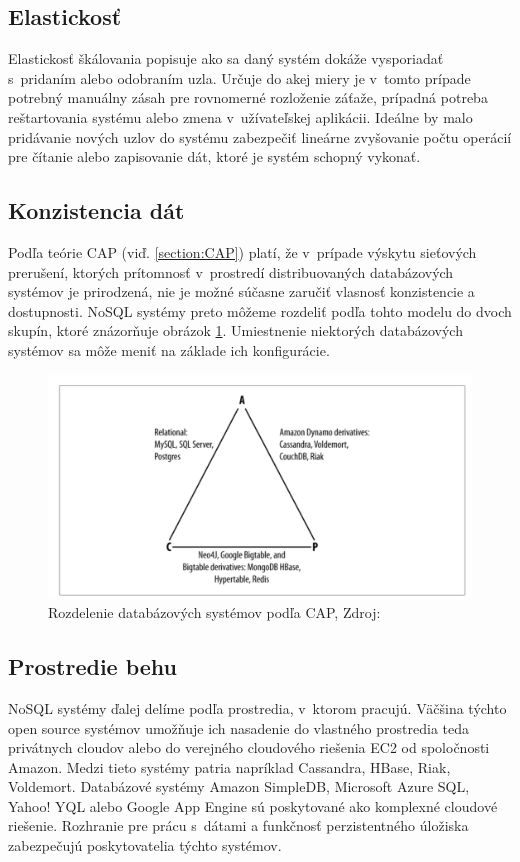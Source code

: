 \documentclass[11pt,twoside,a4paper]{book}
\begin{document}
\subsection{Elastickosť}
Elastickosť škálovania popisuje ako sa daný systém dokáže vysporiadať s~pridaním alebo odobraním uzla. Určuje do akej miery je v~tomto prípade potrebný manuálny zásah pre rovnomerné rozloženie záťaže, prípadná potreba reštartovania systému alebo zmena v~užívateľskej aplikácii. Ideálne by malo pridávanie nových uzlov do systému zabezpečiť lineárne zvyšovanie počtu operácií pre čítanie alebo zapisovanie dát, ktoré je systém schopný vykonať.


\subsection{Konzistencia dát}
Podľa teórie CAP (viď. \ref{section:CAP}) platí, že v~prípade výskytu sieťových prerušení, ktorých prítomnosť v~prostredí distribuovaných databázových systémov je prirodzená, nie je možné súčasne zaručiť vlasnosť konzistencie a dostupnosti. NoSQL systémy preto môžeme rozdeliť podľa tohto modelu do dvoch skupín, ktoré znázorňuje obrázok \ref{fig:scalling2}. Umiestnenie niektorých databázových systémov sa môže meniť na základe ich konfigurácie. 

\begin{figure}[h]
 \centering
 \includegraphics[width=13cm]{./figures/capDatabases.png}
 \caption{Rozdelenie databázových systémov podľa CAP, Zdroj: \cite{hewitt2010cassandra}}
 \label{fig:scalling2}
\end{figure}


\subsection{Prostredie behu}
NoSQL systémy ďalej delíme  podľa prostredia, v~ktorom pracujú. Väčšina týchto open source systémov umožňuje ich nasadenie do vlastného prostredia teda privátnych cloudov alebo do verejného cloudového riešenia EC2 od spoločnosti Amazon. Medzi tieto systémy patria napríklad Cassandra, HBase, Riak, Voldemort. Databázové systémy Amazon SimpleDB, Microsoft Azure SQL, Yahoo! YQL alebo Google App Engine sú poskytované ako komplexné cloudové riešenie. Rozhranie pre prácu s~dátami a funkčnosť perzistentného úložiska zabezpečujú poskytovatelia týchto systémov.
\end{document}
